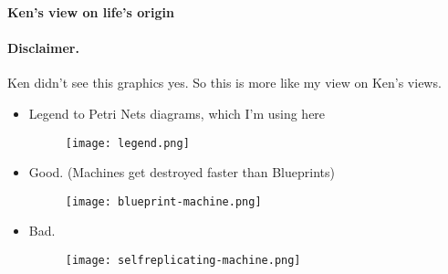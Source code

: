 \documentclass[11pt]{article}
\begin{document}
 \begin{center}
  {\Large \textbf{Ken's view on life's origin}}
 \end{center}
\paragraph{Disclaimer.} Ken didn't see this graphics yes. So this is more like my view on Ken's views.
\begin{itemize}
 \item Legend to Petri Nets diagrams, which I'm using here
\begin{figure}[h!]
 \centering
\texttt{[image: legend.png]}
\end{figure}
\item Good. (Machines get destroyed faster than Blueprints)
\begin{figure}[h!]
 \centering
\texttt{[image: blueprint-machine.png]}
\end{figure}

\item Bad. 
\begin{figure}[h!]
 \centering
\texttt{[image: selfreplicating-machine.png]}
\end{figure}
\end{itemize}
\end{document}
